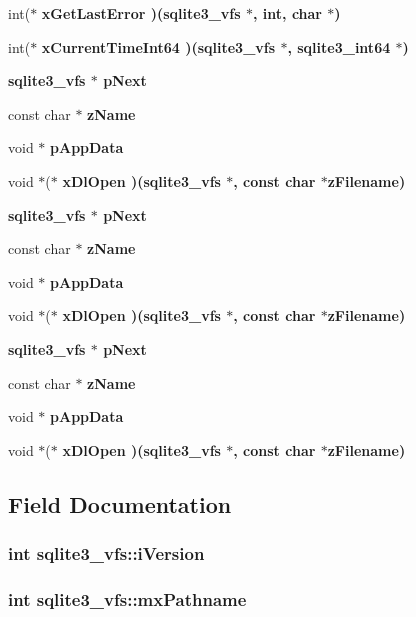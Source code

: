 \begin{CompactItemize}
\item 
int($\ast$ \bf{x\-Get\-Last\-Error} )(\bf{sqlite3\_\-vfs} $\ast$, int, char $\ast$)
\item 
int($\ast$ \bf{x\-Current\-Time\-Int64} )(\bf{sqlite3\_\-vfs} $\ast$, \bf{sqlite3\_\-int64} $\ast$)
\item 
\bf{sqlite3\_\-vfs} $\ast$ \bf{p\-Next}
\item 
const char $\ast$ \bf{z\-Name}
\item 
void $\ast$ \bf{p\-App\-Data}
\item 
void $\ast$($\ast$ \bf{x\-Dl\-Open} )(\bf{sqlite3\_\-vfs} $\ast$, const char $\ast$z\-Filename)
\item 
\bf{sqlite3\_\-vfs} $\ast$ \bf{p\-Next}
\item 
const char $\ast$ \bf{z\-Name}
\item 
void $\ast$ \bf{p\-App\-Data}
\item 
void $\ast$($\ast$ \bf{x\-Dl\-Open} )(\bf{sqlite3\_\-vfs} $\ast$, const char $\ast$z\-Filename)
\item 
\bf{sqlite3\_\-vfs} $\ast$ \bf{p\-Next}
\item 
const char $\ast$ \bf{z\-Name}
\item 
void $\ast$ \bf{p\-App\-Data}
\item 
void $\ast$($\ast$ \bf{x\-Dl\-Open} )(\bf{sqlite3\_\-vfs} $\ast$, const char $\ast$z\-Filename)
\end{CompactItemize}


\subsection{Field Documentation}
\subsubsection{\setlength{\rightskip}{0pt plus 5cm}int \bf{sqlite3\_\-vfs::i\-Version}}\label{structsqlite3__vfs_78287ec546f1990f5f49995275c7586a}


\subsubsection{\setlength{\rightskip}{0pt plus 5cm}int \bf{sqlite3\_\-vfs::mx\-Pathname}}\label{structsqlite3__vfs_bd3e3d07f9f622fb3eb65e287868dcaf}


